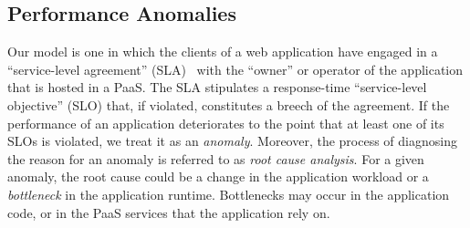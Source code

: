 \subsection{Performance Anomalies}
Our model is one in which the clients of a web application have engaged in a
``service-level agreement'' (SLA)~\cite{Keller:2003:WFS:635430.635442}
with the ``owner'' or operator of the application that is hosted in a PaaS.  The SLA
stipulates a response-time ``service-level objective'' (SLO) that, if violated, constitutes a breech of the
agreement.
If the performance of an application deteriorates to the
point that at least one of its SLOs is violated, we treat it as an \textit{anomaly}. Moreover, the process
of diagnosing the reason for 
an anomaly is referred to as \textit{root cause analysis}.
For a given anomaly, the root cause could be a change in the application workload or
a \textit{bottleneck} in the application runtime. Bottlenecks may occur in the application code, 
or in the PaaS services that the application rely on.



